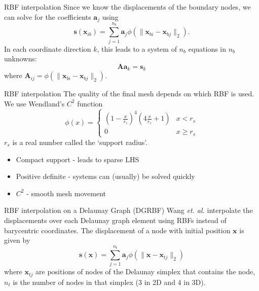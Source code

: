 \documentclass[t,12pt]{beamer}
\let\bld\boldsymbol
\begin{document}
\begin{frame}{RBF interpolation}
Since we know the displacements of the boundary nodes, we can solve for the coefficients $\mathbf{a}_j$ using
\begin{equation}
\mathbf{s}(\mathbf{x}_{ib}) = \sum_{j=1}^{n_b} \mathbf{a}_j \phi(\lVert\mathbf{x}_{bi} - \mathbf{x}_{bj}\rVert_2).
\end{equation}
In each coordinate direction $k$, this leads to a system of $n_b$ equations in $n_b$ unknowns:
\begin{equation}
\mathbf{A}\mathbf{a}_k = \mathbf{s}_k
\label{eqn:rbf_system}
\end{equation}
where $\bld{A}_{ij} = \phi(\lVert\mathbf{x}_{bi} - \mathbf{x}_{bj}\rVert_2)$.
\end{frame}

\begin{frame}{RBF interpolation}
The quality of the final mesh depends on which RBF is used. We use Wendland's $C^2$ function 
\begin{equation}
\phi(x) = 
\begin{cases}
\left(1-\frac{x}{r_s}\right)^4\left(4\frac{x}{r_s} + 1\right) & x < r_s \\
0 & x \geq r_s
\end{cases}
\end{equation}
$r_s$ is a real number called the `support radius'.
\begin{itemize}
	\item Compact support - leads to sparse LHS
	\item Positive definite - systems can (usually) be solved quickly
	\item $C^2$ - smooth mesh movement
\end{itemize}
\end{frame}

\begin{frame}{RBF interpolation on a Delaunay Graph (DGRBF)}
Wang \emph{et. al.}  interpolate the displacements over each Delaunay graph element  using RBFs instead of barycentric coordinates.
The displacement of a node with initial position $\bld{x}$ is given by
\begin{equation}
\mathbf{s}(\mathbf{x}) = \sum_{j=1}^{n_t} \mathbf{a}_j \phi(\lVert\mathbf{x} - \mathbf{x}_{tj}\rVert_2)
\label{eqn:dgrbf}
\end{equation}
where $\bld{x}_{tj}$ are positions of nodes of the Delaunay simplex that contains the node, $n_t$ is the number of nodes in that simplex (3 in 2D and 4 in 3D). 
\end{frame}
\end{document}

